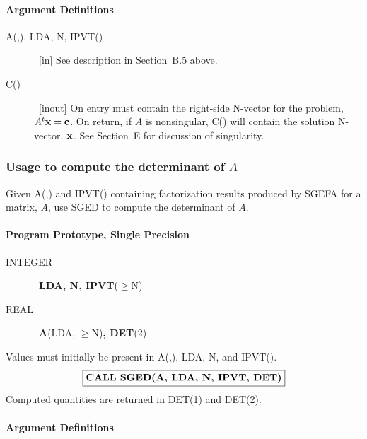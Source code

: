 \documentclass[twoside]{MATH77}
\begin{document}
\paragraph{Argument Definitions}

\begin{description}
\item[A(,), LDA, N, IPVT()] \ [in] See description in Section~B.5 above.

\item[C()] \ [inout] On entry must contain the right-side N-vector for the
problem, $A^t{\bf x} = {\bf c}$. On return, if $A$ is nonsingular, C() will contain the
solution N-vector, ${\bf x}$. See Section~E for discussion of singularity.
\end{description}

\subsubsection{Usage to compute the determinant of $A$}

Given A(,) and IPVT() containing factorization results produced by SGEFA for
a matrix, $A$, use SGED to compute the determinant of $A$.

\paragraph{Program Prototype, Single Precision}

\begin{description}

\item[INTEGER] \ {\bf LDA, N, IPVT}($\geq $N)

\item[REAL] \ {\bf A}(LDA, $\geq $N){\bf , DET}(2)

\end{description}

Values must initially be present in A(,), LDA, N, and IPVT().
$$
\fbox{\bf CALL SGED(A, LDA, N, IPVT, DET)}
$$
Computed quantities are returned in DET(1) and DET(2).

\paragraph{Argument Definitions}
\end{document}
